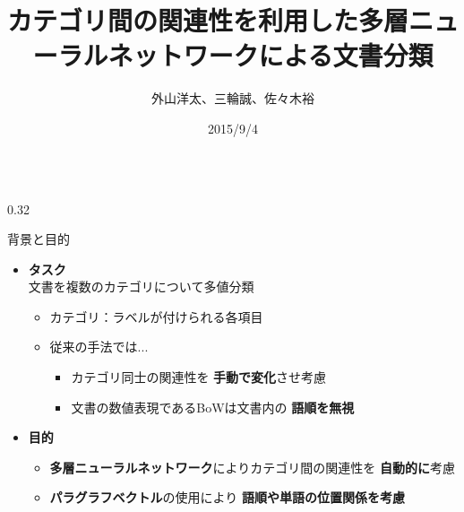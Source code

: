 \documentclass[8pt,unicode]{beamer}
\title{カテゴリ間の関連性を利用した多層ニューラルネットワークによる文書分類}
\author{外山洋太、三輪誠、佐々木裕}
\institute{豊田工業大学 工学部 先端工学基礎学科}
\date{2015/9/4}
\newcommand{\columnscale}{0.32}
\newcommand{\itemtitle}[1]{\textbf{#1} \\}
\newcommand{\good}[1]{\textbf{\color{orange} #1}}
\newcommand{\bad}[1]{\textbf{\color{blue} #1}}
\newcommand{\keyword}[1]{\textbf{\color{red} #1}}
\begin{document}
\begin{frame}{}
\begin{columns}[t]

\begin{column}{\columnscale\textwidth} %
  \begin{block}{背景と目的}
    \begin{itemize}
      \item \itemtitle{タスク}
        文書を複数のカテゴリについて多値分類
        \begin{itemize}
          \item カテゴリ：ラベルが付けられる各項目
          \item 従来の手法では...
            \begin{itemize}
              \item カテゴリ同士の関連性を\bad{手動で変化}させ考慮
              \item 文書の数値表現であるBoWは文書内の\bad{語順を無視}
            \end{itemize}
        \end{itemize}
      \item \itemtitle{目的}
        \begin{itemize}
          \item \keyword{多層ニューラルネットワーク}によりカテゴリ間の関連性を
            \good{自動的に}考慮 \\
          \item \keyword{パラグラフベクトル}の使用により
            \good{語順や単語の位置関係を考慮}
        \end{itemize}
    \end{itemize}
  \end{block}


\end{column}
\end{columns}
\end{frame}
\end{document}
